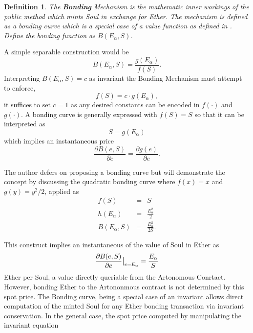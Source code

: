\documentclass[11pt]{amsart}
\newtheorem{definition}{Definition}
\begin{document}
\begin{definition}
The \textbf{Bonding} Mechanism is the mathematic inner workings of the public method which mints Soul in exchange for Ether. The mechanism is defined as a bonding curve which is a special case of a value function as defined in \cite{MZICCS18}. Define the bonding function as $B(E_\alpha, S)$.
\end{definition}
A simple separable construction would be
\begin{equation}
B(E_\alpha, S) = \frac{g(E_\alpha)}{f(S)}.
\end{equation}
Interpreting $B(E_\alpha, S)=c$ as invariant the Bonding Mechanism must attempt to enforce,
\begin{equation}
{f(S)}=c\cdot{g(E_\alpha)},
\end{equation}
it suffices to set $c=1$ as any desired constants can be encoded in $f(\cdot)$ and $g(\cdot)$.  A bonding curve is generally expressed with $f(S) = S$ so that it can be interpreted as
\begin{equation}
S = g(E_\alpha)
\end{equation}
which implies an instantaneous price
\begin{equation}
\frac{\partial B(e,S)}{\partial e} = \frac{\partial g(e)}{\partial e}.
\end{equation}

The author defers on proposing a bonding curve but will demonstrate the concept by discussing the quadratic bonding curve where $f(x)=x$ and $g(y)=y^2/2$, applied as
\begin{eqnarray}
f(S) &=& S\\
h(E_\alpha) &=& \frac{E_\alpha^2}{2}\\
B(E_\alpha, S) &=& \frac{E_\alpha^2}{2S}.
\end{eqnarray}

This construct implies an instantaneous of the value of Soul in Ether as 
\begin{equation}
\frac{\partial B(e,S)}{\partial e} \big{|}_{e=E_\alpha} = \frac{E_\alpha}{S}
\end{equation}
Ether per Soul, a value directly queriable from the Artonomous Conrtact. However, bonding Ether to the Artononmous contract is not determined by this spot price. The Bonding curve, being a special case of an invariant allows direct computation of the minted Soul for any Ether bonding transaction via invariant conservation. In the general case, the spot price computed by manipulating the invariant equation 
\end{document}
